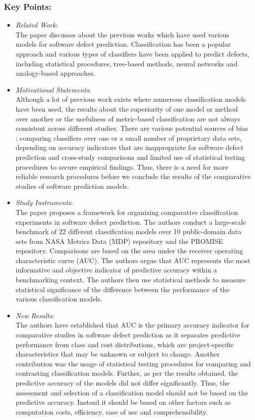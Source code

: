 \documentclass{sig-alternate-05-2015}
\begin{document}
\subsubsection{Key Points:}
\begin{itemize}
\item \emph{Related Work}: \\
The paper discusses about the previous works which have used various models for software defect prediction. Classification has been a popular approach and various types of classifiers have been applied to predict defects, including statistical procedures, tree-based methods, neural networks and analogy-based approaches.
\item \emph{Motivational Statements}: \\
Although a lot of previous work exists where numerous classification models have been used, the results about the superiority of one model or method over another or the usefulness of metric-based classification are not always consistent across different studies. There are various potential sources of bias : comparing classifiers over one or a small number of proprietary data sets, depending on accuracy indicators that are inappropriate for software defect prediction and cross-study comparisons and limited use of statistical testing procedures to secure empirical findings. Thus, there is a need for more reliable research procedures before we conclude the results of the comparative studies of software prediction models.
\item \emph{Study Instruments}: \\
The paper proposes a framework for organizing comparative classification experiments in software defect prediction. The authors conduct a large-scale benchmark of 22 different classification models over 10 public-domain data sets from NASA Metrics Data (MDP) repository and the PROMISE repository. Comparisons are based on the area under the receiver operating characteristic curve (AUC). The authors argue that AUC represents the most informative and objective indicator of predictive accuracy within a benchmarking context. The authors then use statistical methods to measure statistical significance of the difference between the performance of the various classification models.
\item \emph{New Results}: \\
 The authors have established that AUC is the primary accuracy indicator for comparative studies in software defect prediction as it separates predictive performance from class and cost distributions, which are project-specific characteristics that may be unknown or subject to change. Another contribution was the usage of statistical testing procedures for comparing and contrasting classification models. Further, as per the results obtained, the predictive accuracy of the models did not differ significantly. Thus, the assessment and selection of a classification model should not be based on the predictive accuracy. Instead it should be based on other factors such as computation costs, efficiency, ease of use and comprehensibility.
\end{itemize}
\end{document}
